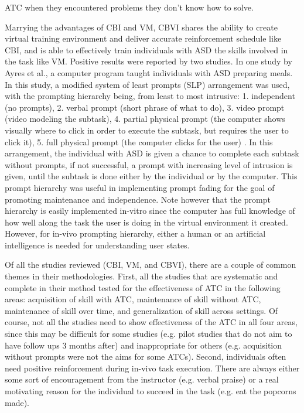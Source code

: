 \documentclass{ut-thesis}
\begin{document}
ATC when they encountered problems they don't know how to solve.

Marrying the advantages of CBI and VM, CBVI shares the ability to create virtual training environment and deliver accurate reinforcement schedule like CBI, and is able to effectively train individuals with ASD the skills involved in the task like VM.  Positive results were reported by two studies.  In one study by Ayres et al., a computer program taught individuals with ASD preparing meals.  In this study, a modified system of least prompts (SLP) arrangement was used, with the prompting hierarchy being, from least to most intrusive: 1. independent (no prompts), 2. verbal prompt (short phrase of what to do), 3. video prompt (video modeling the subtask), 4. partial physical prompt (the computer shows visually where to click in order to execute the subtask, but requires the user to click it), 5. full physical prompt (the computer clicks for the user) \cite{ayres2009acquisition}.  In this arrangement, the individual with ASD is given a chance to complete each subtask without prompts, if not successful, a prompt with increasing level of intrusion is given, until the subtask is done either by the individual or by the computer.  This prompt hierarchy was useful in implementing prompt fading for the goal of promoting maintenance and independence.  Note however that the prompt hierarchy is easily implemented in-vitro since the computer has full knowledge of how well along the task the user is doing in the virtual environment it created.  However, for in-vivo prompting hierarchy, either a human or an artificial intelligence is needed for understanding user states.

Of all the studies reviewed (CBI, VM, and CBVI), there are a couple of common themes in their methodologies.  First, all the studies that are systematic and complete in their method tested for the effectiveness of ATC in the following areas: acquisition of skill with ATC, maintenance of skill without ATC, maintenance of skill over time, and generalization of skill across settings.  Of course, not all the studies need to show effectiveness of the ATC in all four areas, since this may be difficult for some studies (e.g. pilot studies that do not aim to have follow ups 3 months after) and inappropriate for others (e.g. acquisition without prompts were not the aims for some ATCs).  Second, individuals often need positive reinforcement during in-vivo task execution.  There are always either some sort of encouragement from the instructor (e.g. verbal praise) or a real motivating reason for the individual to succeed in the task (e.g. eat the popcorns made).
\end{document}
